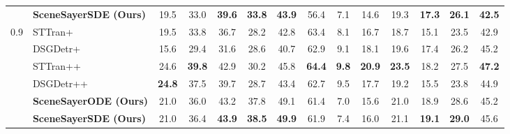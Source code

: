 \begin{table}[!h]
{\begin{tabular}{ll|cccccc|cccccc}
        &        \textbf{SceneSayerSDE (Ours)} & 19.5 & 33.0 & \cellcolor{highlightColor} \textbf{39.6} & \cellcolor{highlightColor} \textbf{33.8} & \cellcolor{highlightColor} \textbf{43.9} & 56.4 & 7.1 & 14.6 & 19.3 & \cellcolor{highlightColor} \textbf{17.3} & \cellcolor{highlightColor} \textbf{26.1} & \cellcolor{highlightColor} \textbf{42.5}  \\ 
          \cmidrule(lr){2-7} \cmidrule(lr){8-13} 
        \multirow{6}{*}{0.9} &        STTran+ \cite{cong_et_al_sttran_2021} & 19.5 & 33.8 & 36.7 & 28.2 & 42.8 & 63.4 & 8.1 & 16.7 & 18.7 & 15.1 & 23.5 & 42.9  \\ 
        &        DSGDetr+ \cite{Feng_2021} & 15.6 & 29.4 & 31.6 & 28.6 & 40.7 & 62.9 & 9.1 & 18.1 & 19.6 & 17.4 & 26.2 & 45.2  \\ 
        &        STTran++ \cite{cong_et_al_sttran_2021} & 24.6 & \cellcolor{highlightColor} \textbf{39.8} & 42.9 & 30.2 & 45.8 & \cellcolor{highlightColor} \textbf{64.4} & \cellcolor{highlightColor} \textbf{9.8} & \cellcolor{highlightColor} \textbf{20.9} & \cellcolor{highlightColor} \textbf{23.5} & 18.2 & 27.5 & \cellcolor{highlightColor} \textbf{47.2}  \\ 
        &        DSGDetr++ \cite{Feng_2021} & \cellcolor{highlightColor} \textbf{24.8} & 37.5 & 39.7 & 28.7 & 43.4 & 62.7 & 9.5 & 17.7 & 19.2 & 15.5 & 23.8 & 44.9  \\ 
        &        \textbf{SceneSayerODE (Ours)} & 21.0 & 36.0 & 43.2 & 37.8 & 49.1 & 61.4 & 7.0 & 15.6 & 21.0 & 18.9 & 28.6 & 45.2  \\ 
        &        \textbf{SceneSayerSDE (Ours)} & 21.0 & 36.4 & \cellcolor{highlightColor} \textbf{43.9} & \cellcolor{highlightColor} \textbf{38.5} & \cellcolor{highlightColor} \textbf{49.9} & 61.9 & 7.4 & 16.0 & 21.1 & \cellcolor{highlightColor} \textbf{19.1} & \cellcolor{highlightColor} \textbf{29.0} & 45.6  \\ 
          \hline 
    \end{tabular}
    }
\end{table}
